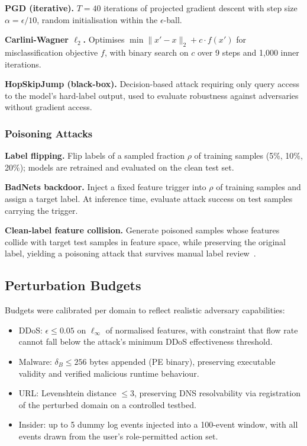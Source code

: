\documentclass[sigconf,nonacm]{acmart}
\begin{document}
\textbf{PGD (iterative).} $T = 40$ iterations of projected gradient descent
with step size $\alpha = \epsilon / 10$, random initialisation within the
$\epsilon$-ball.

\textbf{Carlini-Wagner $\ell_2$.} Optimises
$\min \|x' - x\|_2 + c \cdot f(x')$ for misclassification objective $f$, with
binary search on $c$ over 9 steps and 1{,}000 inner iterations.

\textbf{HopSkipJump (black-box).} Decision-based attack requiring only query
access to the model's hard-label output, used to evaluate robustness against
adversaries without gradient access.

\subsubsection{Poisoning Attacks}

\textbf{Label flipping.} Flip labels of a sampled fraction $\rho$ of training
samples (5\%, 10\%, 20\%); models are retrained and evaluated on the clean
test set.

\textbf{BadNets backdoor.} Inject a fixed feature trigger into $\rho$ of
training samples and assign a target label. At inference time, evaluate
attack success on test samples carrying the trigger.

\textbf{Clean-label feature collision.} Generate poisoned samples whose
features collide with target test samples in feature space, while preserving
the original label, yielding a poisoning attack that survives manual label
review~\cite{shafahi2018poisonfrogs}.

\subsection{Perturbation Budgets}

Budgets were calibrated per domain to reflect realistic adversary capabilities:

\begin{itemize}
  \item DDoS: $\epsilon \leq 0.05$ on $\ell_\infty$ of normalised features,
        with constraint that flow rate cannot fall below the attack's minimum
        DDoS effectiveness threshold.
  \item Malware: $\delta_B \leq 256$ bytes appended (PE binary), preserving
        executable validity and verified malicious runtime behaviour.
  \item URL: Levenshtein distance $\leq 3$, preserving DNS resolvability via
        registration of the perturbed domain on a controlled testbed.
  \item Insider: up to 5 dummy log events injected into a 100-event window,
        with all events drawn from the user's role-permitted action set.
\end{itemize}
\end{document}
